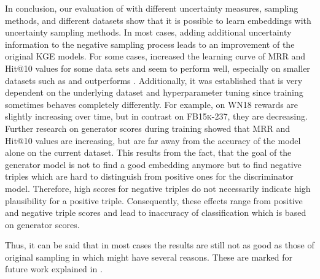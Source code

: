 In conclusion, our evaluation of \usgan with different uncertainty measures, sampling methods, and different datasets show that it is possible to learn embeddings with  uncertainty sampling methods.
In most cases, adding additional uncertainty information to the negative sampling process leads to an improvement of the original \ac{KGE} models.
For some cases, \usgan increased the learning curve of MRR and Hit@10 values for some data sets and seem to perform well, especially on smaller datasets such as \umls and outperforms \kbgan.
Additionally, it was established that \usgan is very dependent on the underlying dataset and hyperparameter tuning since training sometimes behaves completely differently.
For example, on \textsc{WN18} rewards are slightly increasing over time, but in contrast on \textsc{FB15k-237}, they are decreasing.
Further research on generator scores during training showed that MRR and Hit@10 values are increasing, but are far away from the accuracy of the model alone on the current dataset.
This results from the fact, that the goal of the generator model is not to find a good embedding anymore but to find negative triples which are hard to distinguish from positive ones for the discriminator model.
Therefore, high scores for negative triples do not necessarily indicate high plausibility for a positive triple.
Consequently, these effects range from positive and negative triple scores and lead to inaccuracy of classification which is based on generator scores.

Thus, it can be said that in most cases the results are still not as good as those of original sampling in \kbgan which might have several reasons.
These are marked for future work explained in .
